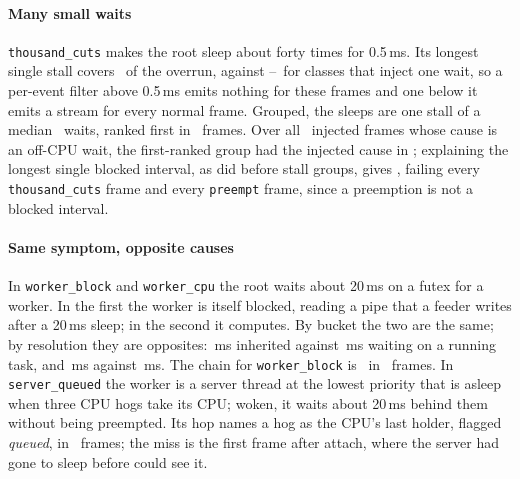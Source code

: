 \paragraph{Many small waits}
\label{sec:eval-cuts}
\texttt{thousand\_cuts} makes the root sleep about forty times for
0.5\,ms. Its longest single stall covers \hbthousandcutsWorstFrac\ of the
overrun, against \hbsingleFracLo--\hbsingleFracHi\ for classes that inject
one wait, so a per-event filter above 0.5\,ms emits nothing for these
frames and one below it emits a stream for every normal frame. Grouped, the
sleeps are one stall of a median \hbthousandcutsTopGroupCount\ waits, ranked
first in \hbthousandcutsTop\ frames. Over all \hbtotRank\ injected frames
whose cause is an off-CPU wait, the first-ranked group had the injected
cause in \hbtotTop; explaining the longest single blocked interval, as \sys
did before stall groups, gives \hbtotOld, failing every
\texttt{thousand\_cuts} frame and every \texttt{preempt} frame, since a
preemption is not a blocked interval. 

\paragraph{Same symptom, opposite causes}
\label{sec:eval-chain}
In \texttt{worker\_block} and \texttt{worker\_cpu} the root waits about
20\,ms on a futex for a worker. In the first the worker is itself blocked,
reading a pipe that a feeder writes after a 20\,ms sleep; in the second it
computes. By bucket the two are the same; by resolution they are opposites:
\hbworkerblockInherited\,ms inherited against \hbworkerblockWaitOncpu\,ms
waiting on a running task, and \hbworkercpuInherited\,ms against
\hbworkercpuWaitOncpu\,ms. The chain for \texttt{worker\_block} is
\hbworkerblockChain\ in \hbworkerblockChainN\ frames. In
\texttt{server\_queued} the worker is a server thread at the lowest priority
that is asleep when three CPU hogs take its CPU; woken, it waits about
20\,ms behind them without being preempted. Its hop names a hog as the
CPU's last holder, flagged \emph{queued}, in \hbserverqueuedHolder\ frames;
the miss is the first frame after attach, where the server had gone to
sleep before \sys could see it.

